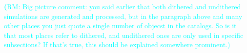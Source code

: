 \documentclass[twocolumn]{aastex62}
\newcommand{\rachel}[1]{{\textcolor{cyan}{{\textbf (RM: #1)}}}}
\begin{document}
\rachel{Big picture comment: you said earlier that both dithered and undithered simulations are generated and processed, but in the paragraph above and many other places you just quote a single number of objecst in the catalogs.  So is it that most places refer to dithered, and undithered ones are only used in specific subsections?  If that's true, this should be explained somewhere prominent.}




\end{document}
